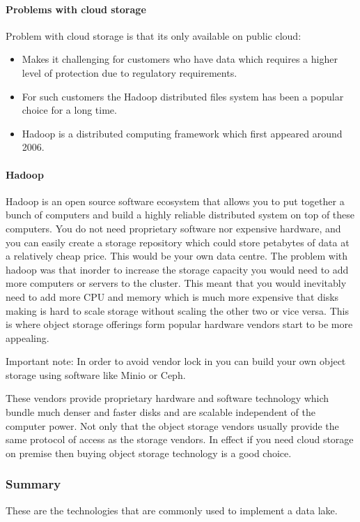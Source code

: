 \paragraph{Problems with cloud storage}
Problem with cloud storage is that its only available on public cloud:
\begin{itemize}
    \item Makes it challenging for customers who have data which requires a higher level of protection due to regulatory requirements.
    \item For such customers the Hadoop distributed files system has been a popular choice for a long time.
    \item Hadoop is a distributed computing framework which first appeared around 2006.
\end{itemize}

\paragraph{Hadoop}
Hadoop is an open source software ecosystem that allows you to put together a bunch of computers and build a highly reliable distributed system on top of these computers.
You do not need proprietary software nor expensive hardware, and you can easily create a storage repository which could store petabytes of data at a relatively cheap price.
This would be your own data centre.
The problem with hadoop was that inorder to increase the storage capacity you would need to add more computers or servers to the cluster.
This meant that you would inevitably need to add more CPU and memory which is much more expensive that disks making is hard to scale storage without scaling the other two or vice versa.
This is where object storage offerings form popular hardware vendors start to be more appealing.
\begin{note}
    Important note: In order to avoid vendor lock in you can build your own object storage using software like Minio or Ceph.
\end{note}

These vendors provide proprietary hardware and software technology which bundle much denser and faster disks and are scalable independent of the computer power.
Not only that the object storage vendors usually provide the same protocol of access as the storage vendors.
In effect if you need cloud storage on premise then buying object storage technology is a good choice.

\subsubsection{Summary}
These are the technologies that are commonly used to implement a data lake.

